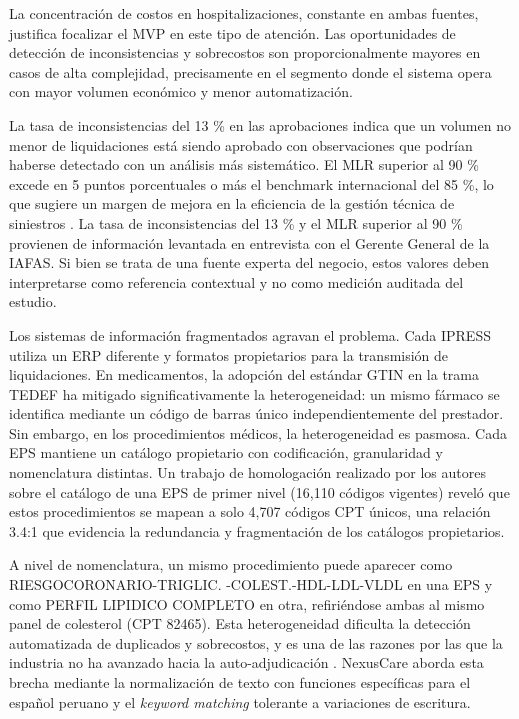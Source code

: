 La concentración de costos en hospitalizaciones, constante en ambas fuentes, justifica focalizar el MVP en este tipo de atención. Las oportunidades de detección de inconsistencias y sobrecostos son proporcionalmente mayores en casos de alta complejidad, precisamente en el segmento donde el sistema opera con mayor volumen económico y menor automatización.

La tasa de inconsistencias del 13 \% en las aprobaciones indica que un volumen no menor de liquidaciones está siendo aprobado con observaciones que podrían haberse detectado con un análisis más sistemático. El MLR superior al 90 \% excede en 5 puntos porcentuales o más el benchmark internacional del 85 \%, lo que sugiere un margen de mejora en la eficiencia de la gestión técnica de siniestros \cite{topol2019high}. La tasa de inconsistencias del 13 \% y el MLR superior al 90 \% provienen de información levantada en entrevista con el Gerente General de la IAFAS. Si bien se trata de una fuente experta del negocio, estos valores deben interpretarse como referencia contextual y no como medición auditada del estudio.

Los sistemas de información fragmentados agravan el problema. Cada IPRESS utiliza un ERP diferente y formatos propietarios para la transmisión de liquidaciones. En medicamentos, la adopción del estándar GTIN en la trama TEDEF ha mitigado significativamente la heterogeneidad: un mismo fármaco se identifica mediante un código de barras único independientemente del prestador. Sin embargo, en los procedimientos médicos, la heterogeneidad es pasmosa. Cada EPS mantiene un catálogo propietario con codificación, granularidad y nomenclatura distintas. Un trabajo de homologación realizado por los autores sobre el catálogo de una EPS de primer nivel (16,110 códigos vigentes) reveló que estos procedimientos se mapean a solo 4,707 códigos CPT únicos, una relación 3.4:1 que evidencia la redundancia y fragmentación de los catálogos propietarios.

A nivel de nomenclatura, un mismo procedimiento puede aparecer como RIESGOCORONARIO-TRIGLIC. -COLEST.-HDL-LDL-VLDL en una EPS y como PERFIL LIPIDICO COMPLETO en otra, refiriéndose ambas al mismo panel de colesterol (CPT 82465). Esta heterogeneidad dificulta la detección automatizada de duplicados y sobrecostos, y es una de las razones por las que la industria no ha avanzado hacia la auto-adjudicación \cite{mandl2012ehr}. NexusCare aborda esta brecha mediante la normalización de texto con funciones específicas para el español peruano y el \textit{keyword matching} tolerante a variaciones de escritura.

